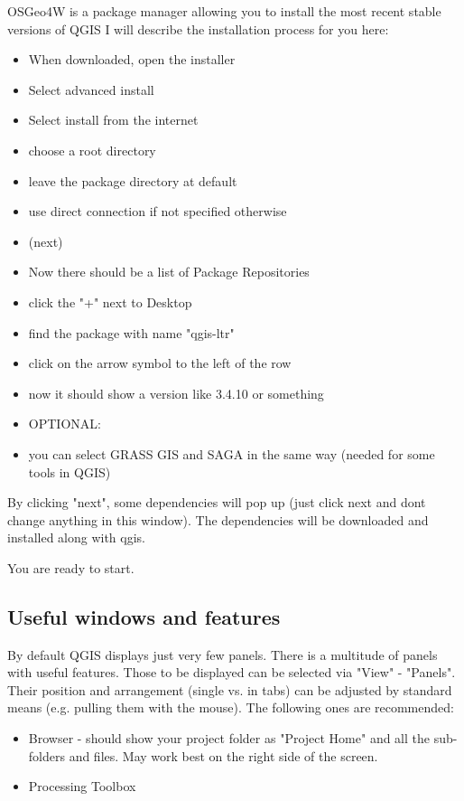 \documentclass[12pt,a4paper]{scrartcl}
\begin{document}
OSGeo4W is a package manager allowing you to install the most recent stable versions of QGIS
I will describe the installation process for you here: \newline

\begin{itemize}
	\item When downloaded, open the installer
	\item Select advanced install
	\item Select install from the internet
	\item choose a root directory 
	\item leave the package directory at default
	\item use direct connection if not specified otherwise
	\item (next)
	\item Now there should be a list of Package Repositories
	\item click the "+" next to Desktop
	\item find the package with name "qgis-ltr"
	\item click on the arrow symbol to the left of the row
	\item now it should show a version like 3.4.10 or something
	\item OPTIONAL: 
	\item you can select GRASS GIS and SAGA in the same way (needed for some tools in QGIS)
\end{itemize}

By clicking "next", some dependencies will pop up (just click next and dont change anything in this window).
The dependencies will be downloaded and installed along with qgis.\newline

You are ready to start.

\subsection{Useful windows and features}
\label{subsec:qgis_adjust}
By default QGIS displays just very few panels. There is a multitude of panels with useful features. Those to be displayed can be selected via "View" - "Panels". Their position and arrangement (single vs. in tabs) can be adjusted by standard means (e.g. pulling them with the mouse). The following ones are recommended:
\begin{itemize}
	\item Browser - should show your project folder as "Project Home"  and all the sub-folders and files. May work best on the right side of the screen.
	\item Processing Toolbox
\end{itemize}
\end{document}
